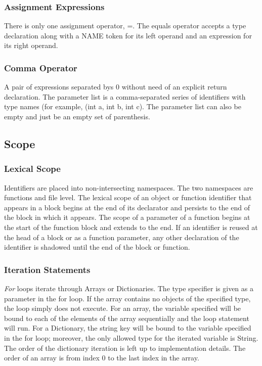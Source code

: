 \documentclass[12pt]{article}
\begin{document}
\subsubsection{Assignment Expressions}
There is only one assignment operator, =.  The equals operator accepts a type declaration along with a NAME token for its left operand and an expression for its right operand. 
 
\subsubsection{Comma Operator}
A pair of expressions separated bys 0 without need of an explicit return declaration. 
The parameter list is a comma-separated series of identifiers with type names (for example, (int a, int b, int c).  The parameter list can also be empty and just be an empty set of parenthesis. 

\subsection{Scope}

\subsubsection{Lexical Scope}
Identifiers are placed into non-intersecting namespaces.  The two namespaces are functions and file level.  The lexical scope of an object or function identifier that appears in a block begins at the end of its declarator and persists to the end of the block in which it appears.  The scope of a parameter of a function begins at the start of the function block and extends to the end.  If an identifier is reused at the head of a block or as a function parameter, any other declaration of the identifier is shadowed until the end of the block or function. 

\subsubsection{Iteration Statements}

\textit{For} loops iterate through Arrays or Dictionaries.  The type specifier is given as a parameter in the for loop.  If the array contains no objects of the specified type, the loop simply does not execute.  For an array, the variable specified will be bound to each of the elements of the array sequentially and the loop statement will run.  For a Dictionary, the string key will be bound to the variable specified in the for loop; moreover, the only allowed type for the iterated variable is String.  The order of the dictionary iteration is left up to implementation details.  The order of an array is from index 0 to the last index in the array.
\end{document}
